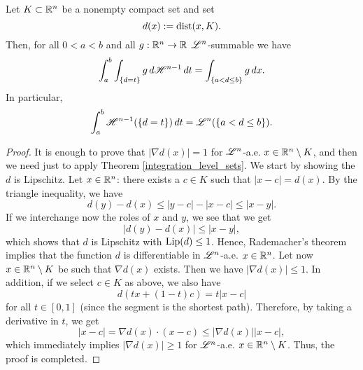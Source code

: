 \begin{theorem} \label{integration_distance_function}
Let $K\subset \mathbb{R}^{n}$ be a nonempty compact set and set $$d(x):= {\rm dist}(x, K).$$
Then, for all $0 < a < b$ and all $g : \mathbb{R}^{n} \to \mathbb{R}$ $\mathscr{L}^{n}$-summable we have
\begin{equation*}
\int_{a}^{b} \int_{\{ d = t\}} g \, d \mathscr{H}^{n - 1} \, dt = \int_{\{ a < d \le b\}} g \, dx.
\end{equation*}
In particular,
\begin{equation*}
\int_{a}^{b} \mathscr{H}^{n - 1}(\{d = t\}) \, dt = \mathscr{L}^{n}(\{ a < d \le b\}).
\end{equation*}
\end{theorem}
\begin{proof}
It is enough to prove that $|\nabla d(x)| = 1$ for $\mathscr{L}^{n}$-a.e. $x \in \mathbb{R}^{n} \setminus K$, and then we need just to apply Theorem \ref{integration_level_sets}. We start by showing the $d$ is Lipschitz. Let $x \in \mathbb{R}^{n}$: there exists a $c \in K$ such that $|x - c| = d(x)$. By the triangle inequality, we have
\begin{equation*}
d(y) - d(x) \le |y - c| - |x - c| \le |x - y|.
\end{equation*}
If we interchange now the roles of $x$ and $y$, we see that we get 
\begin{equation*}
|d(y) - d(x)| \le |x - y|,
\end{equation*}
which shows that $d$ is Lipschitz with $\operatorname{Lip}(d) \le 1$. Hence, Rademacher's theorem implies that the function $d$ is differentiable in $\mathscr{L}^{n}$-a.e. $x \in \mathbb{R}^n$. Let now $x \in \mathbb{R}^{n} \setminus K$ be such that $\nabla d(x)$ exists. Then we have $|\nabla d(x)| \le 1$. In addition, if we select $c \in K$ as above, we also have
\begin{equation*}
d(tx + (1 - t)c) = t |x - c|
\end{equation*}
for all $t \in [0, 1]$ (since the segment is the shortest path). Therefore, by taking a derivative in $t$, we get
\begin{equation*}
|x - c| = \nabla d(x) \cdot (x - c) \le |\nabla d(x)| |x - c|,
\end{equation*}
which immediately implies $|\nabla d(x)| \ge 1$ for $\mathscr{L}^{n}$-a.e. $x \in \mathbb{R}^{n} \setminus K$. Thus, the proof is completed.
\end{proof}
